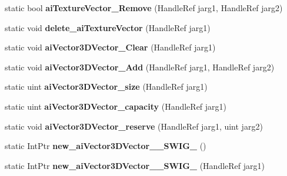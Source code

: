\begin{DoxyCompactItemize}
\item 
\hypertarget{class_assimp_p_i_n_v_o_k_e_aafc694f11c4a86a34c6103cba6fecf83}{static bool {\bfseries ai\+Texture\+Vector\+\_\+\+Remove} (Handle\+Ref jarg1, Handle\+Ref jarg2)}\label{class_assimp_p_i_n_v_o_k_e_aafc694f11c4a86a34c6103cba6fecf83}

\item 
\hypertarget{class_assimp_p_i_n_v_o_k_e_ad6e885fb934c26ff7cc09f3d76dc89ae}{static void {\bfseries delete\+\_\+ai\+Texture\+Vector} (Handle\+Ref jarg1)}\label{class_assimp_p_i_n_v_o_k_e_ad6e885fb934c26ff7cc09f3d76dc89ae}

\item 
\hypertarget{class_assimp_p_i_n_v_o_k_e_a899e74582db2963f09315e35ac60094c}{static void {\bfseries ai\+Vector3\+D\+Vector\+\_\+\+Clear} (Handle\+Ref jarg1)}\label{class_assimp_p_i_n_v_o_k_e_a899e74582db2963f09315e35ac60094c}

\item 
\hypertarget{class_assimp_p_i_n_v_o_k_e_a758e832b8e2563d307bb5a89a24fb4e9}{static void {\bfseries ai\+Vector3\+D\+Vector\+\_\+\+Add} (Handle\+Ref jarg1, Handle\+Ref jarg2)}\label{class_assimp_p_i_n_v_o_k_e_a758e832b8e2563d307bb5a89a24fb4e9}

\item 
\hypertarget{class_assimp_p_i_n_v_o_k_e_ade62a62a5080d6c7fd263fad7f4c0803}{static uint {\bfseries ai\+Vector3\+D\+Vector\+\_\+size} (Handle\+Ref jarg1)}\label{class_assimp_p_i_n_v_o_k_e_ade62a62a5080d6c7fd263fad7f4c0803}

\item 
\hypertarget{class_assimp_p_i_n_v_o_k_e_ada631a541d1711535ae181b519d9afc5}{static uint {\bfseries ai\+Vector3\+D\+Vector\+\_\+capacity} (Handle\+Ref jarg1)}\label{class_assimp_p_i_n_v_o_k_e_ada631a541d1711535ae181b519d9afc5}

\item 
\hypertarget{class_assimp_p_i_n_v_o_k_e_a21cb4d397d521c1d52b8e414c4d940bc}{static void {\bfseries ai\+Vector3\+D\+Vector\+\_\+reserve} (Handle\+Ref jarg1, uint jarg2)}\label{class_assimp_p_i_n_v_o_k_e_a21cb4d397d521c1d52b8e414c4d940bc}

\item 
\hypertarget{class_assimp_p_i_n_v_o_k_e_a23e4f0b1395befe3564a52e8f6920d53}{static Int\+Ptr {\bfseries new\+\_\+ai\+Vector3\+D\+Vector\+\_\+\+\_\+\+S\+W\+I\+G\+\_} ()}\label{class_assimp_p_i_n_v_o_k_e_a23e4f0b1395befe3564a52e8f6920d53}

\item 
\hypertarget{class_assimp_p_i_n_v_o_k_e_a46288f616cb78d911023cd40e5405cac}{static Int\+Ptr {\bfseries new\+\_\+ai\+Vector3\+D\+Vector\+\_\+\+\_\+\+S\+W\+I\+G\+\_} (Handle\+Ref jarg1)}\label{class_assimp_p_i_n_v_o_k_e_a46288f616cb78d911023cd40e5405cac}


\end{DoxyCompactItemize}
